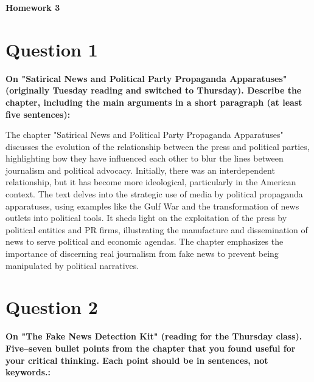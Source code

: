 \documentclass[12pt]{article}
\begin{document}
\begin{center}
\Large \textbf{Homework 3}
\end{center}

\section*{Question 1}
\textbf{On "Satirical News and Political Party Propaganda Apparatuses" (originally Tuesday reading and switched to Thursday). Describe the chapter, including the main arguments in a short paragraph (at least five sentences):}

The chapter "Satirical News and Political Party Propaganda Apparatuses" discusses the evolution of the relationship between the press and political parties, highlighting how they have influenced each other to blur the lines between journalism and political advocacy. Initially, there was an interdependent relationship, but it has become more ideological, particularly in the American context. The text delves into the strategic use of media by political propaganda apparatuses, using examples like the Gulf War and the transformation of news outlets into political tools. It sheds light on the exploitation of the press by political entities and PR firms, illustrating the manufacture and dissemination of news to serve political and economic agendas. The chapter emphasizes the importance of discerning real journalism from fake news to prevent being manipulated by political narratives.

\section*{Question 2}
\textbf{On "The Fake News Detection Kit" (reading for the Thursday class). Five–seven bullet points from the chapter that you found useful for your critical thinking. Each point should be in sentences, not keywords.:}
\end{document}
